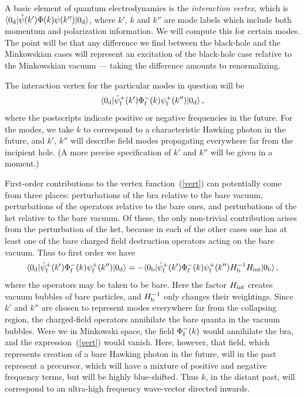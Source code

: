 \documentclass[
%
draft    %
,numberedheadings 
,bibliocites
  ]
  {aipproc}
\begin{document}
A basic element of quantum electrodynamics is
the {\em interaction vertex}, which is $\langle 0_{\rm d}|{\tilde\psi}(k')\Phi (k)\psi (k'')|0_{\rm d}\rangle$, where $k'$, $k$ and $k''$ are mode labels which include both momentum and polarization information.  We will compute this for certain modes.  The point will be that any difference we find between the black-hole and the Minkowskian cases will represent an excitation of the black-hole case relative to the Minkowskian vacuum --- taking the difference amounts to renormalizing.

The interaction vertex for the particular modes in question will be 
\begin{equation}\label{vert}
\langle 0_{\rm d}|{\tilde\psi}_{\rm f}^+(k')\Phi _{\rm f}^- (k)\psi _{\rm f}^+ (k'')|0_{\rm d}\rangle\, ,
\end{equation} 
where the postscripts indicate positive or negative frequencies in the future.  For the modes, we take $k$ to correspond to a characteristic Hawking photon in the future, and $k'$, $k''$ will describe field modes propagating everywhere far from the incipient hole.  (A more precise specification of 
$k'$ and $k''$ will be given in a moment.)



First-order contributions to the vertex function~(\ref{vert}) can potentially come from three places:  perturbations of the bra relative to the bare vacuum, perturbations of the operators relative to the bare ones, and perturbations of the ket relative to the bare vacuum.  Of these, the only non-trivial contribution arises from the perturbation of the ket, because in each of the other cases one has at least one of the bare charged field destruction operators acting on the bare vacuum.  Thus to first order we have
\begin{equation}\label{verte}
\langle 0_{\rm d}|{\tilde\psi}_{\rm f}^+(k')\Phi _{\rm f}^- (k)\psi _{\rm f}^+ (k'')|0_{\rm d}\rangle=
-\langle 0_{\rm b}|{\tilde\psi}_{\rm f}^+(k')\Phi _{\rm f}^- (k)\psi _{\rm f}^+ (k'')H_{\rm b}^{-1}H_{\rm int}|0_{\rm b}\rangle\, ,
\end{equation}
where the operators may be taken to be bare.  Here the factor $H_{\rm int}$ creates vacuum bubbles of bare particles, and $H_{\rm b}^{-1}$ only changes their weightings.  Since $k'$ and $k''$ are chosen to represent modes everywhere far from the collapsing region, the charged-field operators annihilate the bare quanta in the vacuum bubbles.  
Were we in Minkowski space, the field $\Phi ^-_{\rm f}(k)$ would annihilate the bra, and the expression~(\ref{vert}) would vanish.  Here, however, that field, which represents creation of a bare Hawking photon in the future, will in the past represent a precursor, which will have a mixture of positive and negative frequency terms, but will be highly blue-shifted.  Thus $k$, in the distant past, will correspond to an ultra-high frequency wave-vector directed inwards.  
\end{document}
